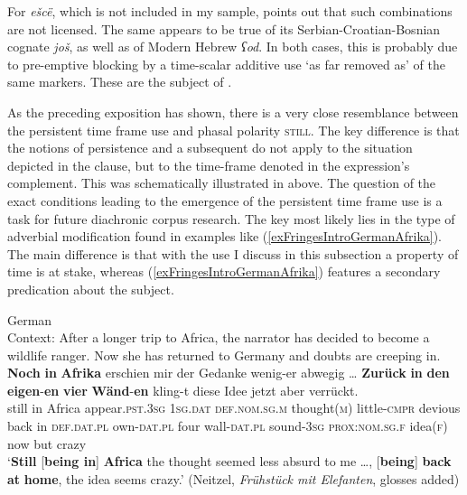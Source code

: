 For  \textit{ešcë}, which is not included in my sample, \textcite{Mustajoki1988} points out that such combinations are not licensed. The same appears to be true of its Serbian\hyp Croatian\hyp Bosnian cognate \textit{još}, as well as of Modern Hebrew \textit{ʕod}. In both cases, this is probably due to pre-emptive blocking by a time-scalar additive use \lq as far removed as\rq{ }of the same markers. These are the subject of .

As the preceding exposition has shown, there is a very close resemblance between the persistent time frame use and phasal polarity \textsc{still}. The key difference is that the notions of persistence and a subsequent  do not apply to the situation depicted in the clause, but to the time-frame denoted in the expression's complement. This was schematically illustrated in  above. The question of the exact conditions leading to the emergence of the persistent time frame use is a task for future diachronic corpus research. The key most likely lies in the type of adverbial modification found in examples like (\ref{exFringesIntroGermanAfrika}). The main difference is that with the use I discuss in this subsection a property of time is at stake, whereas (\ref{exFringesIntroGermanAfrika}) features a secondary predication about the subject.

\begin{exe}
	\ex German\label{exFringesIntroGermanAfrika}\\
	Context: After a longer trip to Africa, the narrator has decided to become a wildlife ranger. Now she has returned to Germany and doubts are creeping in.\\
	\gll \textbf{Noch} \textbf{in} \textbf{Afrika} erschien mir der Gedanke wenig-er abwegig … \textbf{Zurück} \textbf{in} \textbf{den} \textbf{eigen}-\textbf{en} \textbf{vier} \textbf{Wänd}-\textbf{en} kling-t diese Idee jetzt aber verrückt.\\
	still in Africa appear.\textsc{pst}.3\textsc{sg} 1\textsc{sg}.\textsc{dat} \textsc{def}.\textsc{nom}.\textsc{sg}.\textsc{m} thought(\textsc{m}) little-\textsc{cmpr} devious {} back in \textsc{def}.\textsc{dat}.\textsc{pl} own-\textsc{dat}.\textsc{pl} four wall-\textsc{dat}.\textsc{pl} sound-3\textsc{sg} \textsc{prox}:\textsc{nom}.\textsc{sg}.\textsc{f} idea(\textsc{f}) now but crazy\\
	\glt \lq \textbf{Still} [\textbf{being in}] \textbf{Africa} the thought seemed less absurd to me …, [\textbf{being}] \textbf{back} \textbf{at} \textbf{home}, the idea seems crazy.\rq{ }	(Neitzel, \textit{Frühstück mit Elefanten}, glosses added)
\end{exe}

